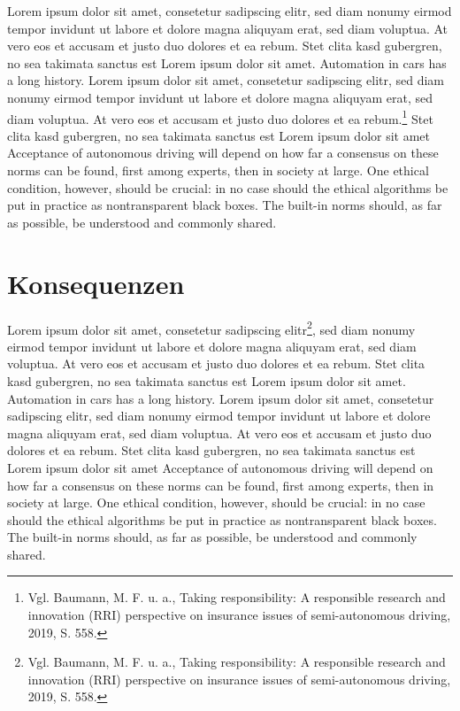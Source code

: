 Lorem ipsum dolor sit amet, consetetur sadipscing elitr, sed diam nonumy eirmod tempor invidunt ut labore et dolore magna aliquyam erat, sed diam voluptua. 
At vero eos et accusam et justo duo dolores et ea rebum. 
Stet clita kasd gubergren, no sea takimata sanctus est Lorem ipsum dolor sit amet. 
Automation in cars has a long history.  Lorem ipsum dolor sit amet, consetetur sadipscing elitr, sed diam nonumy eirmod tempor invidunt ut labore et dolore magna aliquyam erat, sed diam voluptua. 
At vero eos et accusam et justo duo dolores et ea rebum.\footnote{Vgl. Baumann, M. F. u. a., Taking responsibility: A responsible research and innovation (RRI) perspective on insurance issues of semi-autonomous driving, 2019, S. 558.}
Stet clita kasd gubergren, no sea takimata sanctus est Lorem ipsum dolor sit amet Acceptance of autonomous driving will depend on how far a consensus on these norms can be found, first among experts, then in society at large. 
One ethical condition, however, should be crucial: in no case should the ethical algorithms be put in practice as nontransparent black boxes. 
The built-in norms should, as far as possible, be understood and commonly shared.

\section{Konsequenzen}

Lorem ipsum dolor sit amet, consetetur sadipscing elitr\footnote{Vgl. Baumann, M. F. u. a., Taking responsibility: A responsible research and innovation (RRI) perspective on insurance issues of semi-autonomous driving, 2019, S. 558.}, sed diam nonumy eirmod tempor invidunt ut labore et dolore magna aliquyam erat, sed diam voluptua. 
At vero eos et accusam et justo duo dolores et ea rebum. 
Stet clita kasd gubergren, no sea takimata sanctus est Lorem ipsum dolor sit amet. 
Automation in cars has a long history.  Lorem ipsum dolor sit amet, consetetur sadipscing elitr, sed diam nonumy eirmod tempor invidunt ut labore et dolore magna aliquyam erat, sed diam voluptua. 
At vero eos et accusam et justo duo dolores et ea rebum. 
Stet clita kasd gubergren, no sea takimata sanctus est Lorem ipsum dolor sit amet Acceptance of autonomous driving will depend on how far a consensus on these norms can be found, first among experts, then in society at large. 
One ethical condition, however, should be crucial: in no case should the ethical algorithms be put in practice as nontransparent black boxes. 
The built-in norms should, as far as possible, be understood and commonly shared.